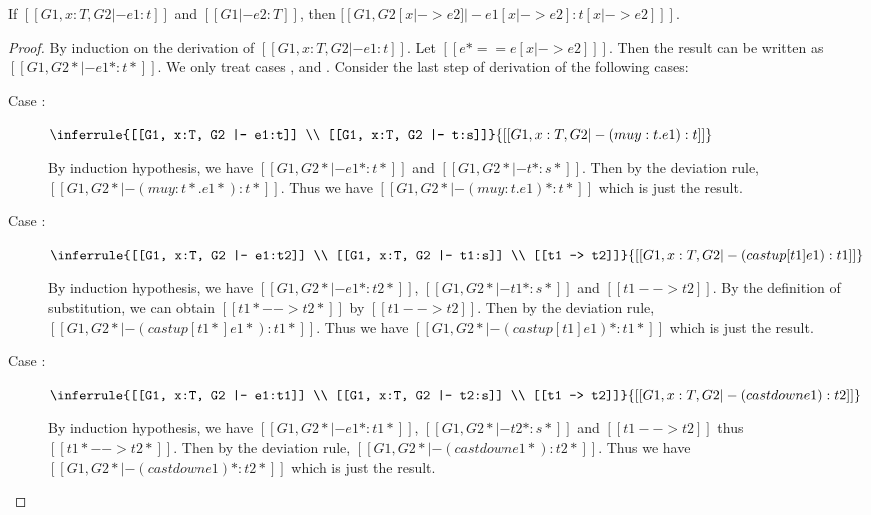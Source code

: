 \begin{lem}\label{lem:subst}
	If $[[G1, x:T, G2 |- e1:t]]$ and $[[G1 |- e2:T]]$, then $[[G1, G2 [x |-> e2] |- e1[x |-> e2]  : t[x |-> e2] ]]$.
\end{lem}

\begin{proof}
    By induction on the derivation of $[[G1, x:T, G2 |- e1:t]]$. Let $[[e* == e [x |-> e2] ]]$. Then the result can be written as $[[G1, G2* |- e1*  : t* ]]$. We only treat cases ,  and . Consider the last step of derivation of the following cases:
    \begin{description}
        \item[Case :] $\inferrule{[[G1, x:T, G2 |- e1:t]] \\ [[G1, x:T, G2 |- t:s]]}{[[G1, x:T, G2 |- (mu y:t.e1): t]]}$ 
        
        By induction hypothesis, we have $[[G1, G2* |- e1* : t*]]$ and $[[G1, G2* |- t* : s*]]$. Then by the deviation rule, $[[G1, G2* |- (mu y:t*.e1*):t*]]$. Thus we have $[[G1, G2* |- (mu y:t.e1)*:t*]]$ which is just the result.
        \item[Case :] $\inferrule{[[G1, x:T, G2 |- e1:t2]] \\ [[G1, x:T, G2 |- t1:s]] \\ [[t1 --> t2]]}{[[G1, x:T, G2 |- (castup [t1] e1):t1]]}$ 
        
        By induction hypothesis, we have $[[G1, G2* |- e1*:t2*]]$, $[[G1, G2* |- t1*:s*]]$ and $[[t1 --> t2]]$. By the definition of substitution, we can obtain $[[t1* --> t2*]]$ by $[[t1 --> t2]]$. Then by the deviation rule, $[[G1, G2* |- (castup [t1*] e1*):t1*]]$. Thus we have $[[G1, G2* |- (castup [t1] e1)*:t1*]]$ which is just the result.
        \item[Case :] $\inferrule{[[G1, x:T, G2 |- e1:t1]] \\ [[G1, x:T, G2 |- t2:s]] \\ [[t1 --> t2]]}{[[G1, x:T, G2 |- (castdown e1):t2]]}$ 
        
        By induction hypothesis, we have $[[G1, G2* |- e1*:t1*]]$, $[[G1, G2* |- t2*:s*]]$ and $[[t1 --> t2]]$ thus $[[t1* --> t2*]]$. Then by the deviation rule, $[[G1, G2* |- (castdown e1*):t2*]]$. Thus we have $[[G1, G2* |- (castdown e1)*:t2*]]$ which is just the result.
    \end{description}
\end{proof}

